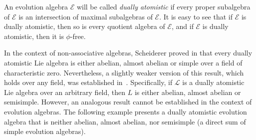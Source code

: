 \documentclass[12pt,reqno]{amsart}
\theoremstyle{definition}
\theoremstyle{remark}
\numberwithin{equation}{section}
\begin{document}
An evolution algebra $\mathcal{E}$ will be called \textit{dually atomistic} if every proper subalgebra of $\mathcal{E}$ is an intersection of maximal subalgebras of $\mathcal{E}$. It is easy to see that if $\mathcal{E}$ is dually atomistic, then so is every quotient algebra of $\mathcal{E}$, and if $\mathcal{E}$ is dually atomistic, then it is $\phi$-free.

In the context of non-associative algebras, Scheiderer proved in \cite{scheiderer} that every dually atomistic Lie algebra is either abelian, almost abelian or simple over a field of characteristic zero. Nevertheless, a slightly weaker version of this result, which holds over any field, was established in~\cite{paez2023subalgebra}. Specifically, if $\mathcal{L}$ is a dually atomistic Lie algebra over an arbitrary field, then $L$ is either abelian, almost abelian or semisimple.
However, an analogous result cannot be established in the context of evolution algebras. The following example presents a dually atomistic evolution algebra that is neither abelian, almost abelian, nor semisimple (a direct sum of simple evolution algebras).
\end{document}
